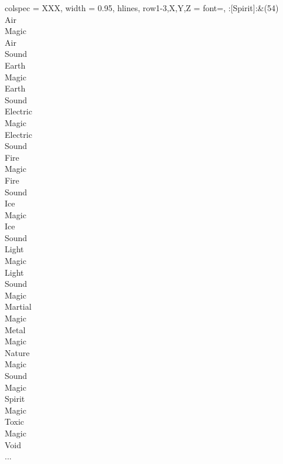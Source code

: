 \begin{longtblr}[
	caption = {2v1 Defending Weak},
	label = {2v1-Defending-Weak},
]{
	colspec = {XXX}, width = 0.95\linewidth,
	hlines,
	row{1-3,X,Y,Z} = {font=\bfseries},
}
	:[Spirit]:&{(54)\\
	Air \\
	Magic \\
	Air \\
	Sound \\
	Earth \\
	Magic \\
	Earth \\
	Sound \\
	Electric \\
	Magic \\
	Electric \\
	Sound \\
	Fire \\
	Magic \\
	Fire \\
	Sound \\
	Ice \\
	Magic \\
	Ice \\
	Sound \\
	Light \\
	Magic \\
	Light \\
	Sound \\
	Magic \\
	Martial \\
	Magic \\
	Metal \\
	Magic \\
	Nature \\
	Magic \\
	Sound \\
	Magic \\
	Spirit \\
	Magic \\
	Toxic \\
	Magic \\
	Void \\
	...\\
	}\\


\end{longtblr}
